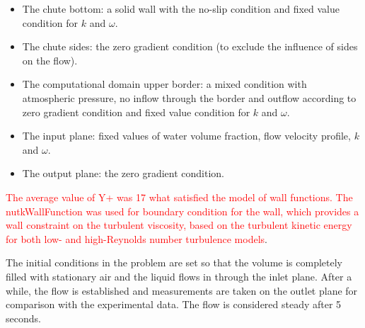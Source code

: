 \documentclass[applsci,article,submit,moreauthors,pdftex]{Definitions/mdpi}
\begin{document}
\begin{itemize}

    \item The chute bottom: a solid wall with the no-slip condition and fixed value condition for $k$ and $\omega$.
    
    \item The chute sides: the zero gradient condition (to exclude the influence of sides on the flow).
    
    \item The computational domain upper border: a mixed condition with atmospheric pressure, no inflow through the border and outflow according to zero gradient condition and fixed value condition for $k$ and $\omega$.
    
    \item The input plane: fixed values of water volume fraction, flow velocity profile, $k$ and $\omega$.
    
    \item The output plane: the zero gradient condition.
    
\end{itemize}

\textcolor{red}{The average value of Y+ was 17 what satisfied the model of wall functions. The nutkWallFunction was used for boundary condition for the wall, which provides a wall constraint on the turbulent viscosity, based on the turbulent kinetic energy for both low- and high-Reynolds number turbulence models}.


The initial conditions in the problem are set so that the volume is completely filled with stationary air and the liquid flows in through the inlet plane. After a while, the flow is established and measurements are taken on the outlet plane for comparison with the experimental data. The flow is considered steady after 5 seconds.




\end{document}
